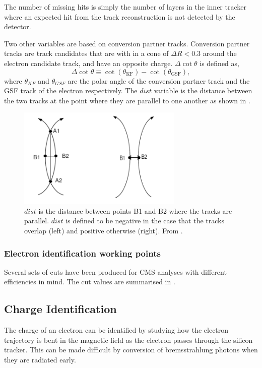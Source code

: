 The number of missing hits is simply the number of layers in the inner
tracker where an expected hit from the track reconstruction is not detected by
the detector.

Two other variables are based on conversion partner tracks.
Conversion partner tracks are track candidates that are with in a cone of $\Delta
R < 0.3$ around the electron candidate track, and have an opposite charge. 
$\Delta\cot\theta$ is defined as,
\begin{equation}
\Delta \cot \theta \equiv \cot(\theta_{\text{KF}}) - \cot(\theta_{\text{GSF}}),
\end{equation}
where $\theta_{KF}$ and $\theta_{GSF}$ are the polar angle of the conversion
partner track and the GSF track of the electron respectively.
The $dist$ variable is the distance between the two tracks at the point where
they are parallel to one another as shown in .

\begin{figure}[htb]
  \centering
  \includegraphics[width=0.7\textwidth]{dist}
  \caption{$dist$ is the distance between points B1 and B2 where the tracks are
parallel. $dist$ is defined to be negative in the case that the tracks overlap
(left) and positive otherwise (right). From \cite{eConver}.}
  \label{fig:dist}
\end{figure}

\subsubsection{Electron identification working points}

Several sets of cuts have been produced for CMS analyses with different
efficiencies in mind. The cut values are summarised in 
\cite{nikos}.


\subsection{Charge Identification}
The charge of an electron can be identified by studying how the electron
trajectory is bent in the magnetic field as the electron passes through the
silicon tracker. This can be made difficult by conversion of bremsstrahlung
photons when they are radiated early. 

